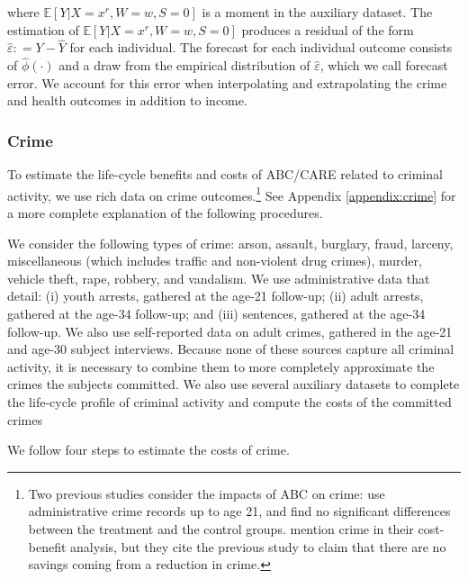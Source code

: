 \noindent where $\mathbb{E} \left[ Y | X = x^r, W = w, S = 0 \right]$ is a moment in the auxiliary dataset. The estimation of $\mathbb{E} \left[ Y | X = x^r, W = w, S = 0 \right]$ produces a residual of the form $\widehat{\varepsilon} : = Y - \widehat{Y}$ for each individual. The forecast for each  individual outcome consists of $\widehat{\phi} \left( \cdot \right)$ and a draw from the empirical distribution of $\widehat{\varepsilon}$, which we call forecast error. We account for this error when interpolating and extrapolating the crime and health outcomes in addition to income.

\subsubsection{Crime}  \label{sec:crime}

To estimate the life-cycle benefits and costs of ABC/CARE related to criminal activity, we use rich data on crime outcomes.\footnote{Two previous studies consider the impacts of ABC on crime: \citet{Clarke_Campbell_1998_ABC_Comparison_ECRQ} use administrative crime records up to age 21, and find no significant differences between the treatment and the control groups. \cite{Barnett_Masse_2007_EER} mention crime in their cost-benefit analysis, but they cite the previous study to claim that there are no savings coming from a reduction in crime.} See Appendix \ref{appendix:crime} for a more complete explanation of the following procedures.

We consider the following types of crime: arson, assault, burglary, fraud, larceny, miscellaneous (which includes traffic and non-violent drug crimes), murder, vehicle theft, rape, robbery, and vandalism. We use administrative data that detail: (i) youth arrests, gathered at the age-21 follow-up; (ii) adult arrests, gathered at the age-34 follow-up; and (iii) sentences, gathered at the age-34 follow-up. We also use self-reported data on adult crimes, gathered in the age-21 and age-30 subject interviews. Because none of these sources capture all criminal activity, it is necessary to combine them to more completely approximate the crimes the subjects committed. We also use several auxiliary datasets to complete the life-cycle profile of criminal activity and compute the costs of the committed crimes

We follow four steps to estimate the costs of crime. 

